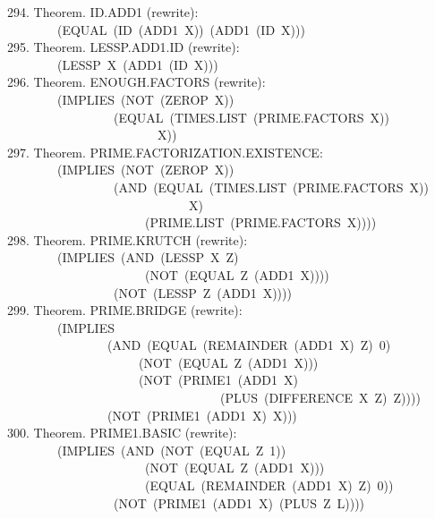 \documentclass[10pt]{book}
\newenvironment{pubasis}{\begin{flushleft}}{\end{flushleft}}
\begin{document}
\begin{pubasis}
294.    Theorem.  ID.ADD1 (rewrite):\\
~~~~~~~~(EQUAL~(ID~(ADD1~X))~(ADD1~(ID~X)))\\

295.    Theorem.  LESSP.ADD1.ID (rewrite):\\
~~~~~~~~(LESSP~X~(ADD1~(ID~X)))\\

296.    Theorem.  ENOUGH.FACTORS (rewrite):\\
~~~~~~~~(IMPLIES~(NOT~(ZEROP~X))\\
~~~~~~~~~~~~~~~~~(EQUAL~(TIMES.LIST~(PRIME.FACTORS~X))\\
~~~~~~~~~~~~~~~~~~~~~~~~X))\\

297.    Theorem.  PRIME.FACTORIZATION.EXISTENCE:\\
~~~~~~~~(IMPLIES~(NOT~(ZEROP~X))\\
~~~~~~~~~~~~~~~~~(AND~(EQUAL~(TIMES.LIST~(PRIME.FACTORS~X))\\
~~~~~~~~~~~~~~~~~~~~~~~~~~~~~X)\\
~~~~~~~~~~~~~~~~~~~~~~(PRIME.LIST~(PRIME.FACTORS~X))))\\

298.    Theorem.  PRIME.KRUTCH (rewrite):\\
~~~~~~~~(IMPLIES~(AND~(LESSP~X~Z)\\
~~~~~~~~~~~~~~~~~~~~~~(NOT~(EQUAL~Z~(ADD1~X))))\\
~~~~~~~~~~~~~~~~~(NOT~(LESSP~Z~(ADD1~X))))\\

299.    Theorem.  PRIME.BRIDGE (rewrite):\\
~~~~~~~~(IMPLIES\\
~~~~~~~~~~~~~~~~(AND~(EQUAL~(REMAINDER~(ADD1~X)~Z)~0)\\
~~~~~~~~~~~~~~~~~~~~~(NOT~(EQUAL~Z~(ADD1~X)))\\
~~~~~~~~~~~~~~~~~~~~~(NOT~(PRIME1~(ADD1~X)\\
~~~~~~~~~~~~~~~~~~~~~~~~~~~~~~~~~~(PLUS~(DIFFERENCE~X~Z)~Z))))\\
~~~~~~~~~~~~~~~~(NOT~(PRIME1~(ADD1~X)~X)))\\

300.    Theorem.  PRIME1.BASIC (rewrite):\\
~~~~~~~~(IMPLIES~(AND~(NOT~(EQUAL~Z~1))\\
~~~~~~~~~~~~~~~~~~~~~~(NOT~(EQUAL~Z~(ADD1~X)))\\
~~~~~~~~~~~~~~~~~~~~~~(EQUAL~(REMAINDER~(ADD1~X)~Z)~0))\\
~~~~~~~~~~~~~~~~~(NOT~(PRIME1~(ADD1~X)~(PLUS~Z~L))))\\


\end{pubasis}
\end{document}
